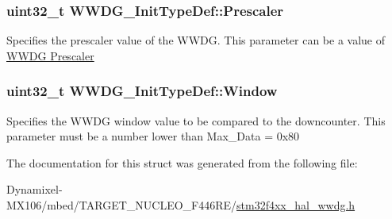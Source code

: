 \subsubsection[{\texorpdfstring{Prescaler}{Prescaler}}]{\setlength{\rightskip}{0pt plus 5cm}uint32\+\_\+t W\+W\+D\+G\+\_\+\+Init\+Type\+Def\+::\+Prescaler}\hypertarget{struct_w_w_d_g___init_type_def_a13973d685b89ebd47e985f912d54b225}{}\label{struct_w_w_d_g___init_type_def_a13973d685b89ebd47e985f912d54b225}
Specifies the prescaler value of the W\+W\+DG. This parameter can be a value of \hyperlink{group___w_w_d_g___prescaler}{W\+W\+DG Prescaler} 
\subsubsection[{\texorpdfstring{Window}{Window}}]{\setlength{\rightskip}{0pt plus 5cm}uint32\+\_\+t W\+W\+D\+G\+\_\+\+Init\+Type\+Def\+::\+Window}\hypertarget{struct_w_w_d_g___init_type_def_aac1f83c04d7c2f284943add80347d44c}{}\label{struct_w_w_d_g___init_type_def_aac1f83c04d7c2f284943add80347d44c}
Specifies the W\+W\+DG window value to be compared to the downcounter. This parameter must be a number lower than Max\+\_\+\+Data = 0x80 

The documentation for this struct was generated from the following file\+:\begin{DoxyCompactItemize}
\item 
Dynamixel-\/\+M\+X106/mbed/\+T\+A\+R\+G\+E\+T\+\_\+\+N\+U\+C\+L\+E\+O\+\_\+\+F446\+R\+E/\hyperlink{stm32f4xx__hal__wwdg_8h}{stm32f4xx\+\_\+hal\+\_\+wwdg.\+h}\end{DoxyCompactItemize}
